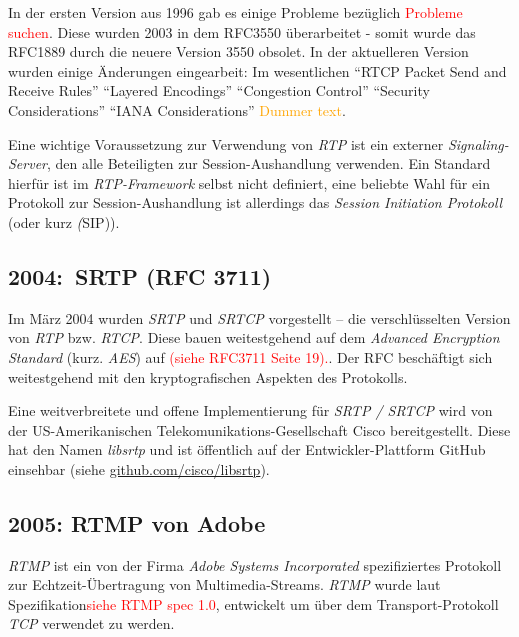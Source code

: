 \documentclass[journal]{IEEEtran}
\begin{document}
In der ersten Version aus 1996 gab es einige Probleme bezüglich
\textcolor{red}{Probleme suchen}. Diese wurden 2003 in dem RFC3550
überarbeitet - somit wurde das RFC1889 durch die neuere Version 3550 obsolet.
In der aktuelleren Version wurden einige Änderungen eingearbeit: Im
wesentlichen ``RTCP Packet Send and Receive Rules'' ``Layered Encodings''
``Congestion Control'' ``Security Considerations'' ``IANA Considerations''
\textcolor{orange}{Dummer text}.

Eine wichtige Voraussetzung zur Verwendung von \textit{RTP} ist ein externer
\textit{Signaling-Server}, den alle Beteiligten zur Session-Aushandlung
verwenden. Ein Standard hierfür ist im \textit{RTP-Framework} selbst nicht
definiert, eine beliebte Wahl für ein Protokoll zur Session-Aushandlung ist
allerdings das \textit{Session Initiation Protokoll} (oder kurz \textit(SIP)).

\subsection{2004:\ SRTP (RFC 3711)}

Im März 2004 wurden \textit{SRTP} und \textit{SRTCP} vorgestellt – die
verschlüsselten Version von \textit{RTP} bzw. \textit{RTCP}. Diese bauen
weitestgehend auf dem \textit{Advanced Encryption Standard} (kurz.
\textit{AES}) auf \textcolor{red}{(siehe RFC3711 Seite 19).}. Der RFC
beschäftigt sich weitestgehend mit den kryptografischen Aspekten des
Protokolls.

Eine weitverbreitete und offene Implementierung für \textit{SRTP / SRTCP}
wird von der US-Amerikanischen Telekomunikations-Gesellschaft Cisco
bereitgestellt. Diese hat den Namen \textit{libsrtp} und ist öffentlich auf der
Entwickler-Plattform GitHub einsehbar (siehe
\href{https://github.com/cisco/libsrtp}{github.com/cisco/libsrtp}).


\subsection{2005: RTMP von Adobe}

\textit{RTMP} ist ein von der Firma \textit{Adobe Systems Incorporated}
spezifiziertes Protokoll zur Echtzeit-Übertragung von Multimedia-Streams.
\textit{RTMP} wurde laut Spezifikation\textcolor{red}{siehe RTMP spec 1.0},
entwickelt um über dem Transport-Protokoll \textit{TCP} verwendet zu werden.
\end{document}
